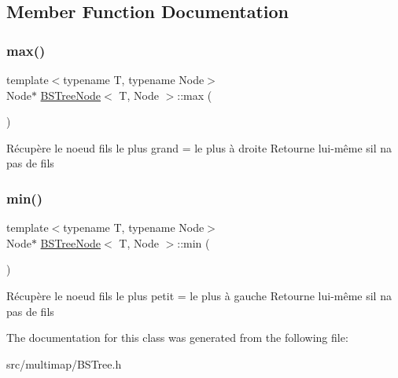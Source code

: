 \subsection{Member Function Documentation}
\mbox{\label{classBSTreeNode_aa2bc109220f6782ad1f9fbb80b7dca60}} 
\subsubsection{\texorpdfstring{max()}{max()}}
{\footnotesize\ttfamily template$<$typename T, typename Node$>$ \\
Node$\ast$ \hyperlink{classBSTreeNode}{B\+S\+Tree\+Node}$<$ T, Node $>$\+::max (\begin{DoxyParamCaption}{ }\end{DoxyParamCaption})\hspace{0.3cm}{\ttfamily [inline]}}

Récupère le noeud fils le plus grand = le plus à droite Retourne lui-\/même s\textquotesingle{}il n\textquotesingle{}a pas de fils \mbox{\label{classBSTreeNode_a02645620a3cb4ab4f9d15b1207422cb3}} 
\subsubsection{\texorpdfstring{min()}{min()}}
{\footnotesize\ttfamily template$<$typename T, typename Node$>$ \\
Node$\ast$ \hyperlink{classBSTreeNode}{B\+S\+Tree\+Node}$<$ T, Node $>$\+::min (\begin{DoxyParamCaption}{ }\end{DoxyParamCaption})\hspace{0.3cm}{\ttfamily [inline]}}

Récupère le noeud fils le plus petit = le plus à gauche Retourne lui-\/même s\textquotesingle{}il n\textquotesingle{}a pas de fils 

The documentation for this class was generated from the following file\+:\begin{DoxyCompactItemize}
\item 
src/multimap/B\+S\+Tree.\+h\end{DoxyCompactItemize}
